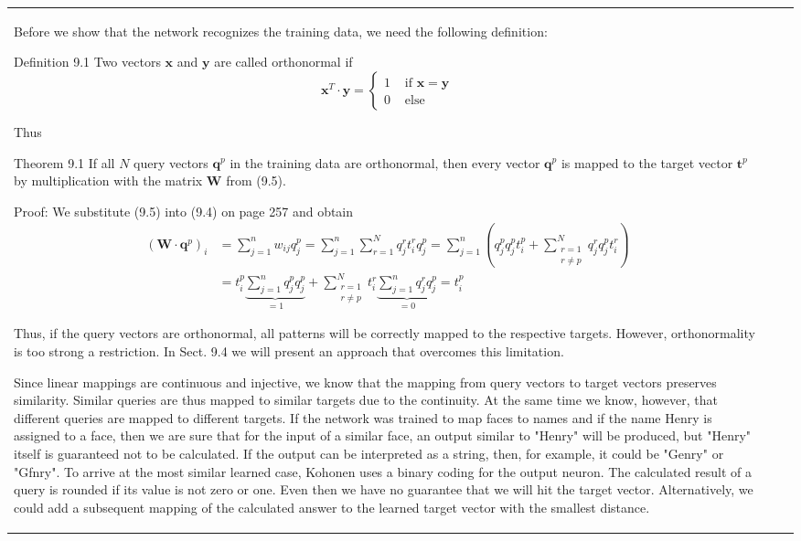 \documentclass[10pt]{book}
\begin{document}
\begin{center}
\begin{tabular}{|l|l|l|}
Before we show that the network recognizes the training data, we need the following definition:

Definition 9.1 Two vectors $\boldsymbol{x}$ and $\boldsymbol{y}$ are called orthonormal if
$$
\boldsymbol{x}^{T} \cdot \boldsymbol{y}= \begin{cases}1 & \text { if } \boldsymbol{x}=\boldsymbol{y} \\ 0 & \text { else }\end{cases}
$$

Thus

Theorem 9.1 If all $N$ query vectors $\boldsymbol{q}^{p}$ in the training data are orthonormal, then every vector $\boldsymbol{q}^{p}$ is mapped to the target vector $\boldsymbol{t}^{p}$ by multiplication with the matrix $\boldsymbol{W}$ from (9.5).

Proof: We substitute (9.5) into (9.4) on page 257 and obtain
$$
\begin{aligned}
\left(\boldsymbol{W} \cdot \boldsymbol{q}^{p}\right)_{i} & =\sum_{j=1}^{n} w_{i j} q_{j}^{p}=\sum_{j=1}^{n} \sum_{r=1}^{N} q_{j}^{r} t_{i}^{r} q_{j}^{p}=\sum_{j=1}^{n}\left(q_{j}^{p} q_{j}^{p} t_{i}^{p}+\sum_{\substack{r=1 \\
r \neq p}}^{N} q_{j}^{r} q_{j}^{p} t_{i}^{r}\right) \\
& =t_{i}^{p} \underbrace{\sum_{j=1}^{n} q_{j}^{p} q_{j}^{p}}_{=1}+\sum_{\substack{r=1 \\
r \neq p}}^{N} t_{i}^{r} \underbrace{\sum_{j=1}^{n} q_{j}^{r} q_{j}^{p}}_{=0}=t_{i}^{p}
\end{aligned}
$$

Thus, if the query vectors are orthonormal, all patterns will be correctly mapped to the respective targets. However, orthonormality is too strong a restriction. In Sect. 9.4 we will present an approach that overcomes this limitation.

Since linear mappings are continuous and injective, we know that the mapping from query vectors to target vectors preserves similarity. Similar queries are thus mapped to similar targets due to the continuity. At the same time we know, however, that different queries are mapped to different targets. If the network was trained to map faces to names and if the name Henry is assigned to a face, then we are sure that for the input of a similar face, an output similar to "Henry" will be produced, but "Henry" itself is guaranteed not to be calculated. If the output can be interpreted as a string, then, for example, it could be "Genry" or "Gfnry". To arrive at the most similar learned case, Kohonen uses a binary coding for the output neuron. The calculated result of a query is rounded if its value is not zero or one. Even then we have no guarantee that we will hit the target vector. Alternatively, we could add a subsequent mapping of the calculated answer to the learned target vector with the smallest distance.


\end{tabular}
\end{center}
\end{document}
